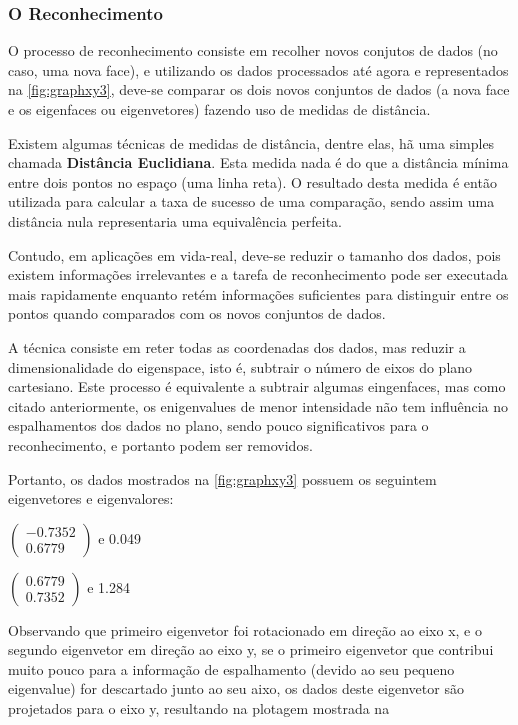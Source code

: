\subsubsection{O Reconhecimento}\label{subsec:eigenacp}

O processo de reconhecimento consiste em recolher novos conjutos de dados (no caso, uma nova face), e utilizando os dados processados até agora e representados na \autoref{fig:graphxy3}, deve-se comparar os dois novos conjuntos de dados (a nova face e os eigenfaces ou eigenvetores) fazendo uso de medidas de distância. 

Existem algumas técnicas de medidas de distância, dentre elas, hã uma simples chamada \textbf{Distância Euclidiana}. Esta medida nada é do que a distância mínima entre dois pontos no espaço (uma linha reta). O resultado desta medida é então utilizada para calcular a taxa de sucesso de uma comparação, sendo assim uma distância nula representaria uma equivalência perfeita.

Contudo, em aplicações em vida-real, deve-se reduzir o tamanho dos dados, pois existem informações irrelevantes e a tarefa de reconhecimento pode ser executada mais rapidamente enquanto retém informações suficientes para distinguir entre os pontos quando comparados com os novos conjuntos de dados.

A técnica consiste em reter todas as coordenadas dos dados, mas reduzir a dimensionalidade do eigenspace, isto é, subtrair o número de eixos do plano cartesiano. Este processo é equivalente a subtrair algumas eingenfaces, mas como citado anteriormente, os enigenvalues de menor intensidade não tem influência no espalhamentos dos dados no plano, sendo pouco significativos para o reconhecimento, e portanto podem ser removidos.

Portanto, os dados mostrados na  \autoref{fig:graphxy3} possuem os seguintem eigenvetores e eigenvalores:

\begin{center}
	$\begin{pmatrix} -0.7352 \\ 0.6779 \end{pmatrix}$  e 0.049
	
	$\begin{pmatrix} 0.6779 \\ 0.7352 \end{pmatrix}$  e 1.284
\end{center}

Observando que primeiro eigenvetor foi rotacionado em direção ao eixo x, e o segundo eigenvetor em direção ao eixo y, se o primeiro eigenvetor que contribui muito pouco para a informação de espalhamento (devido ao seu pequeno eigenvalue) for descartado junto ao seu aixo, os dados deste eigenvetor são projetados para o eixo y, resultando na plotagem mostrada na 

